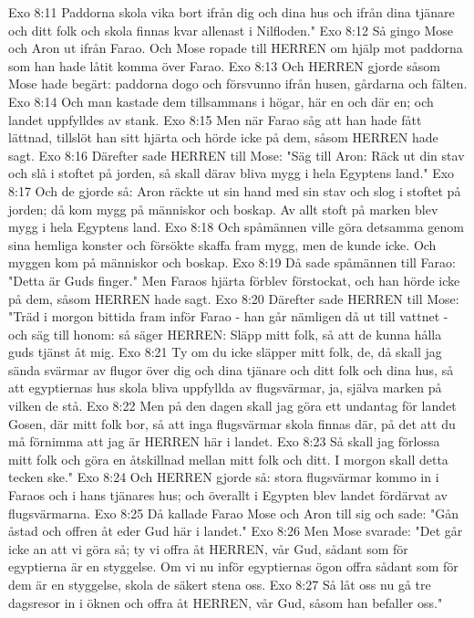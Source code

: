 Exo 8:11  Paddorna skola vika bort ifrån dig och dina hus och ifrån dina tjänare och ditt folk och skola finnas kvar allenast i Nilfloden."
Exo 8:12  Så gingo Mose och Aron ut ifrån Farao. Och Mose ropade till HERREN om hjälp mot paddorna som han hade låtit komma över Farao.
Exo 8:13  Och HERREN gjorde såsom Mose hade begärt: paddorna dogo och försvunno ifrån husen, gårdarna och fälten.
Exo 8:14  Och man kastade dem tillsammans i högar, här en och där en; och landet uppfylldes av stank.
Exo 8:15  Men när Farao såg att han hade fått lättnad, tillslöt han sitt hjärta och hörde icke på dem, såsom HERREN hade sagt.
Exo 8:16  Därefter sade HERREN till Mose: "Säg till Aron: Räck ut din stav och slå i stoftet på jorden, så skall därav bliva mygg i hela Egyptens land."
Exo 8:17  Och de gjorde så: Aron räckte ut sin hand med sin stav och slog i stoftet på jorden; då kom mygg på människor och boskap. Av allt stoft på marken blev mygg i hela Egyptens land.
Exo 8:18  Och spåmännen ville göra detsamma genom sina hemliga konster och försökte skaffa fram mygg, men de kunde icke. Och myggen kom på människor och boskap.
Exo 8:19  Då sade spåmännen till Farao: "Detta är Guds finger." Men Faraos hjärta förblev förstockat, och han hörde icke på dem, såsom HERREN hade sagt.
Exo 8:20  Därefter sade HERREN till Mose: "Träd i morgon bittida fram inför Farao - han går nämligen då ut till vattnet - och säg till honom: så säger HERREN: Släpp mitt folk, så att de kunna hålla guds tjänst åt mig.
Exo 8:21  Ty om du icke släpper mitt folk, de, då skall jag sända svärmar av flugor över dig och dina tjänare och ditt folk och dina hus, så att egyptiernas hus skola bliva uppfyllda av flugsvärmar, ja, själva marken på vilken de stå.
Exo 8:22  Men på den dagen skall jag göra ett undantag för landet Gosen, där mitt folk bor, så att inga flugsvärmar skola finnas där, på det att du må förnimma att jag är HERREN här i landet.
Exo 8:23  Så skall jag förlossa mitt folk och göra en åtskillnad mellan mitt folk och ditt. I morgon skall detta tecken ske."
Exo 8:24  Och HERREN gjorde så: stora flugsvärmar kommo in i Faraos och i hans tjänares hus; och överallt i Egypten blev landet fördärvat av flugsvärmarna.
Exo 8:25  Då kallade Farao Mose och Aron till sig och sade: "Gån åstad och offren åt eder Gud här i landet."
Exo 8:26  Men Mose svarade: "Det går icke an att vi göra så; ty vi offra åt HERREN, vår Gud, sådant som för egyptierna är en styggelse. Om vi nu inför egyptiernas ögon offra sådant som för dem är en styggelse, skola de säkert stena oss.
Exo 8:27  Så låt oss nu gå tre dagsresor in i öknen och offra åt HERREN, vår Gud, såsom han befaller oss."
